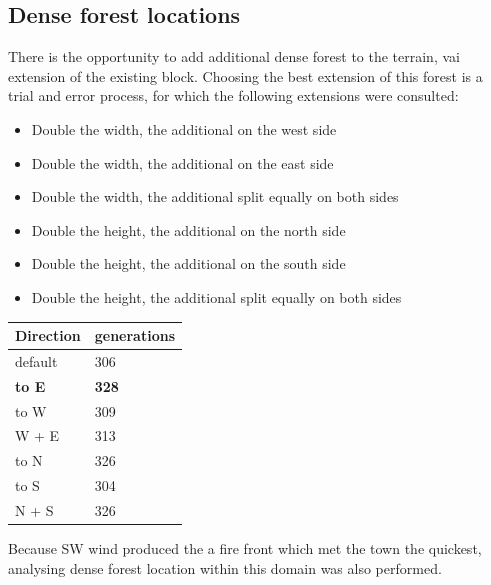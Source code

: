 \documentclass[11pt, a4paper, titlepage]{article}
\begin{document}
\subsection{Dense forest locations}
There is the opportunity to add additional dense forest to the terrain, vai extension of the existing block. Choosing the best extension of this forest is a trial and error process, for which the following extensions were consulted:
 \begin{itemize}
   \item Double the width, the additional on the west side
   \item Double the width, the additional on the east side
   \item Double the width, the additional split equally on both sides
   \item Double the height, the additional on the north side
   \item Double the height, the additional on the south side
   \item Double the height, the additional split equally on both sides

 \end{itemize}

 \begin{table}[H]
  \centering
  \begin{tabular}{|l|l|}
  \hline
  Direction & generations \\ \hline
  default & 306 \\ \hline
  \textbf{to E}    & \textbf{328} \\ \hline
  to W    & 309 \\ \hline
  W + E   & 313 \\ \hline
  to N    & 326 \\ \hline
  to S    & 304 \\ \hline
  N + S    & 326 \\ \hline
  
  
  
  
  \end{tabular}
  \end{table}

  Because SW wind produced the a fire front which met the town the quickest, analysing dense forest location within this domain was also performed.
\end{document}
